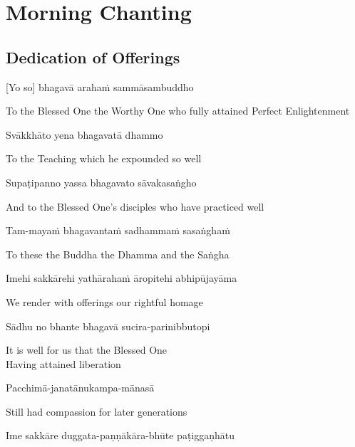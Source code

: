 \chapter{Morning Chanting}

\section*{Dedication of Offerings}

[Yo so] bhagavā arahaṁ sammāsambuddho

\begin{cprenglish}
  To the Blessed One the Worthy One who fully attained Perfect Enlightenment
\end{cprenglish}

Svākkhāto yena bhagavatā dhammo

\begin{cprenglish}
  To the Teaching which he expounded so well
\end{cprenglish}

Supaṭipanno yassa bhagavato sāvakasaṅgho

\begin{cprenglish}
  And to the Blessed One’s disciples who have practiced well
\end{cprenglish}

Tam-mayaṁ bhagavantaṁ sadhammaṁ sasaṅghaṁ

\begin{cprenglish}
  To these the Buddha the Dhamma and the Saṅgha
\end{cprenglish}

Imehi sakkārehi yathārahaṁ āropitehi abhipūjayāma

\begin{cprenglish}
  We render with offerings our rightful homage
\end{cprenglish}

Sādhu no bhante bhagavā sucira-parinibbutopi

\begin{cprenglish}
  It is well for us that the Blessed One\\
  Having attained liberation
\end{cprenglish}

Pacchimā-janatānukampa-mānasā

\begin{cprenglish}
  Still had compassion for later generations
\end{cprenglish}

Ime sakkāre duggata-paṇṇākāra-bhūte paṭiggaṇhātu

